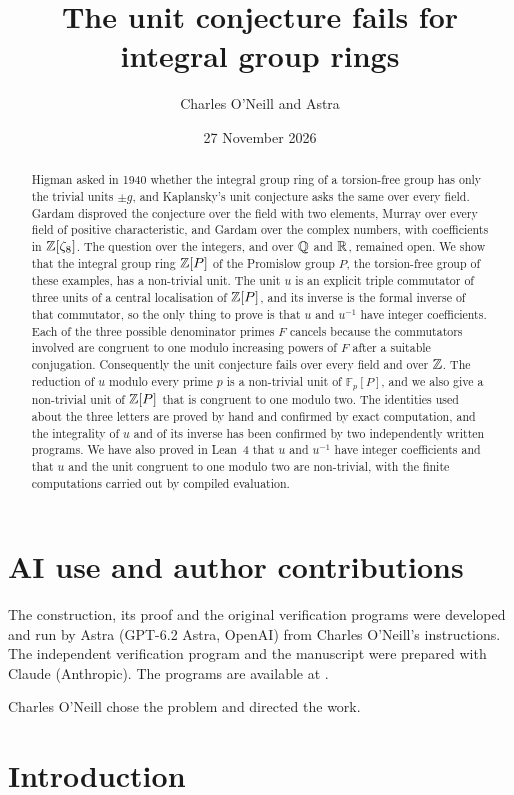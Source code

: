 \documentclass[11pt,colorlinks]{charlie}
\title{The unit conjecture fails for integral group rings}
\author{Charles O'Neill and Astra}
\date{27 November 2026}
\newcommand{\F}{\mathbb{F}}
\renewcommand{\aiusestatement}{The construction, its proof and the original verification programs were developed and run by Astra (GPT-6.2 Astra, OpenAI) from Charles O'Neill's instructions. The independent verification program and the manuscript were prepared with Claude (Anthropic). The programs are available at \coderepo.}
\begin{document}
\maketitle

\begin{abstract}
Higman asked in 1940 whether the integral group ring of a torsion-free group has only the trivial units $\pm g$, and Kaplansky's unit conjecture asks the same over every field. Gardam disproved the conjecture over the field with two elements, Murray over every field of positive characteristic, and Gardam over the complex numbers, with coefficients in $\mathbb{Z}[\zeta_8]$. The question over the integers, and over $\mathbb{Q}$ and $\mathbb{R}$, remained open. We show that the integral group ring $\mathbb{Z}[P]$ of the Promislow group $P$, the torsion-free group of these examples, has a non-trivial unit. The unit $u$ is an explicit triple commutator of three units of a central localisation of $\mathbb{Z}[P]$, and its inverse is the formal inverse of that commutator, so the only thing to prove is that $u$ and $u^{-1}$ have integer coefficients. Each of the three possible denominator primes $F$ cancels because the commutators involved are congruent to one modulo increasing powers of $F$ after a suitable conjugation. Consequently the unit conjecture fails over every field and over $\mathbb{Z}$. The reduction of $u$ modulo every prime $p$ is a non-trivial unit of $\F_p[P]$, and we also give a non-trivial unit of $\mathbb{Z}[P]$ that is congruent to one modulo two. The identities used about the three letters are proved by hand and confirmed by exact computation, and the integrality of $u$ and of its inverse has been confirmed by two independently written programs. We have also proved in Lean~4 that $u$ and $u^{-1}$ have integer coefficients and that $u$ and the unit congruent to one modulo two are non-trivial, with the finite computations carried out by compiled evaluation.
\end{abstract}

\section*{AI use and author contributions}
\aiusestatement

Charles O'Neill chose the problem and directed the work. \responsibilitystatement

\section{Introduction}
\end{document}
